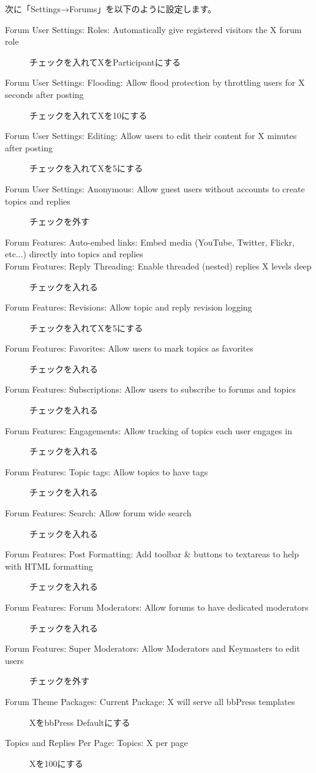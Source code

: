 \documentclass[titlepage,10pt,a4paper,uplatex]{jsbook}
\begin{document}
次に「Settings→Forums」を以下のように設定します。

\begin{description}
\item[Forum User Settings: Roles: Automatically give registered visitors the X forum role] チェックを入れてXをParticipantにする
\item[Forum User Settings: Flooding: Allow flood protection by throttling users for X seconds after posting] チェックを入れてXを10にする
\item[Forum User Settings: Editing: Allow users to edit their content for X minutes after posting] チェックを入れてXを5にする
\item[Forum User Settings: Anonymous: Allow guest users without accounts to create topics and replies] チェックを外す
\item[Forum Features: Auto-embed links: Embed media (YouTube, Twitter, Flickr, etc...) directly into topics and replies] 
\item[Forum Features: Reply Threading: Enable threaded (nested) replies X levels deep] チェックを入れる
\item[Forum Features: Revisions: Allow topic and reply revision logging] チェックを入れてXを5にする
\item[Forum Features: Favorites: Allow users to mark topics as favorites] チェックを入れる
\item[Forum Features: Subscriptions: Allow users to subscribe to forums and topics] チェックを入れる
\item[Forum Features: Engagements: Allow tracking of topics each user engages in] チェックを入れる
\item[Forum Features: Topic tags: Allow topics to have tags] チェックを入れる
\item[Forum Features: Search: Allow forum wide search] チェックを入れる
\item[Forum Features: Post Formatting: Add toolbar \& buttons to textareas to help with HTML formatting] チェックを入れる
\item[Forum Features: Forum Moderators: Allow forums to have dedicated moderators] チェックを入れる
\item[Forum Features: Super Moderators: Allow Moderators and Keymasters to edit users] チェックを外す
\item[Forum Theme Packages: Current Package: X will serve all bbPress templates] XをbbPress Defaultにする
\item[Topics and Replies Per Page: Topics: X per page] Xを100にする

\end{description}
\end{document}
